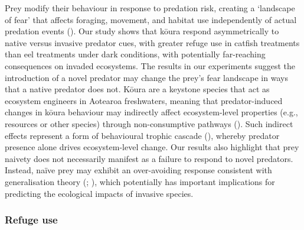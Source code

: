 \documentclass[
  letterpaper,
  DIV=11,
  numbers=noendperiod]{scrartcl}
\begin{document}
Prey modify their behaviour in response to predation risk, creating a
`landscape of fear' that affects foraging, movement, and habitat use
independently of actual predation events
(). Our study shows that
kōura respond asymmetrically to native versus invasive predator cues,
with greater refuge use in catfish treatments than eel treatments under
dark conditions, with potentially far-reaching consequences on invaded
ecosystems. The results in our experiments suggest the introduction of a
novel predator may change the prey's fear landscape in ways that a
native predator does not. Kōura are a keystone species that act as
ecosystem engineers in Aotearoa freshwaters, meaning that
predator-induced changes in kōura behaviour may indirectly affect
ecosystem-level properties (e.g., resources or other species) through
non-consumptive pathways (). Such indirect effects represent a form of behavioural trophic
cascade (), whereby
predator presence alone drives ecosystem-level change. Our results also
highlight that prey naivety does not necessarily manifest as a failure
to respond to novel predators. Instead, naïve prey may exhibit an
over-avoiding response consistent with generalisation theory
(;
), which potentially has
important implications for predicting the ecological impacts of invasive
species.

\subsubsection{Refuge use}\label{refuge-use}
\end{document}
